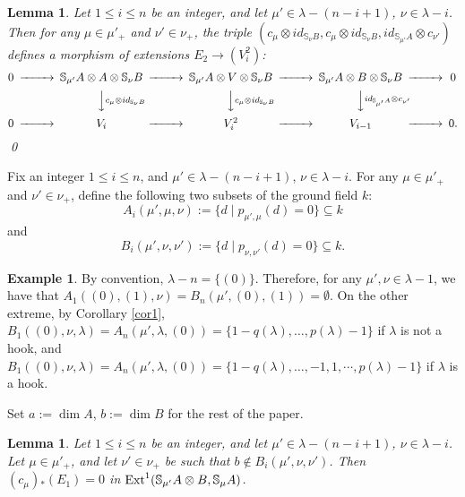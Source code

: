 \documentclass{amsart}
\newtheorem{lemma}[theorem]{Lemma}
\theoremstyle{definition}
\newtheorem{example}[theorem]{Example}
\newcommand{\Ext}{\text{\rm Ext}^1}
\newcommand{\ot}{\otimes}
\begin{document}
\begin{lemma}\label{l}
Let $1\le i\le n$ be an integer, and let $\mu'\in \lambda-(n-i+1)$,
$\nu\in \lambda-i$. Then for any $\mu\in \mu'_+$ and $\nu'\in
\nu_+$, the triple $(c_{\mu}\ot id_{\mathbb{S}_{\nu}B},c_{\mu}\ot
id_{\mathbb{S}_{\nu}B},id_{\mathbb{S}_{\mu'}A}\ot c_{\nu'})$ defines
a morphism of extensions $E_2\to (V_{i}^2)$:
\begin{equation*}
\begin{CD} 0 @>>> \mathbb{S}_{\mu'}A\ot A\ot
\mathbb{S}_{\nu}B @>>> \mathbb{S}_{\mu'}A\ot V\ot \mathbb{S}_{\nu}B
@>>> \mathbb{S}_{\mu'}A\ot B\ot \mathbb{S}_{\nu}B @>>> 0\\
@. @VVc_{\mu}\ot id_{\mathbb{S}_{\nu}B}V @VVc_{\mu}\ot
id_{\mathbb{S}_{\nu}B}V @VVid_{\mathbb{S}_{\mu'}A} \ot c_{\nu'}V @.\\
0 @>>> V_i @>>> V_{i}^2 @>>> V_{i-1}@>>> 0.
\end{CD}
\end{equation*}
\qed
\end{lemma}

Fix an integer $1\le i\le n$, and $\mu'\in \lambda-(n-i+1)$, $\nu\in
\lambda-i$. For any $\mu\in \mu'_+$ and $\nu'\in \nu_+$, define the
following two subsets of the ground field $k$:
\begin{equation}\label{ai}
A_i(\mu',\mu,\nu):=\{d\mid p_{\mu',\mu}(d)=0\}\subseteq k
\end{equation}
and
\begin{equation}\label{bi}
B_i(\mu',\nu,\nu'):=\{d\mid p_{\nu,\nu'}(d)=0\}\subseteq k.
\end{equation}

\begin{example}\label{extreme}
By convention, $\lambda-n=\{(0)\}$. Therefore, for any $\mu',\nu\in
\lambda-1$, we have that
$A_1((0),(1),\nu)=B_n(\mu',(0),(1))=\emptyset$. On the other
extreme, by Corollary \ref{cor1},
$B_1((0),\nu,\lambda)=A_n(\mu',\lambda,(0))=\{1-q(\lambda),\dots,p(\lambda)-1\}$
if $\lambda$ is not a hook, and
$B_1((0),\nu,\lambda)=A_n(\mu',\lambda,(0))
=\{1-q(\lambda),\dots,-1,1,\cdots,p(\lambda)-1\}$ if $\lambda$ is a
hook.
\end{example}

Set $a:=\dim A$, $b:=\dim B$ for the rest of the paper.

\begin{lemma}\label{ll}
Let $1\le i\le n$ be an integer, and let $\mu'\in \lambda-(n-i+1)$,
$\nu\in \lambda-i$. Let $\mu\in \mu'_+$, and let $\nu'\in \nu_+$ be
such that $b\notin B_i(\mu',\nu,\nu')$. Then $(c_{\mu}){_*}(E_1)=0$
in $\Ext(\mathbb{S}_{\mu'}A\ot B,\mathbb{S}_{\mu}A)$.
\end{lemma}
\end{document}
